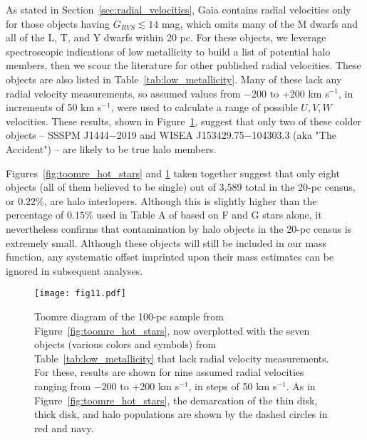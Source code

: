 \documentclass[twocolumn,tighten,twocolappendix]{aastex631}
\begin{document}
As stated in Section~\ref{sec:radial_velocities}, Gaia contains radial velocities only for those objects having $G_{RVS} \lesssim 14$ mag, which omits many of the M dwarfs and all of the L, T, and Y dwarfs within 20 pc. For these objects, we leverage spectroscopic indications of low metallicity to build a list of potential halo members, then we scour the literature for other published radial velocities. These objects are also listed in Table~\ref{tab:low_metallicity}. Many of these lack any radial velocity measurements, so assumed values from $-$200 to +200 km s$^{-1}$, in increments of 50 km s$^{-1}$, were used to calculate a range of possible $U, V, W$ velocities. These results, shown in Figure~\ref{fig:toomre_cold_stars}, suggest that only two of these colder objects -- SSSPM J1444$-$2019 and WISEA J153429.75$-$104303.3 (aka "The Accident") -- are likely to be true halo members. 

Figures~\ref{fig:toomre_hot_stars} and \ref{fig:toomre_cold_stars} taken together suggest that only eight objects (all of them believed to be single) out of 3,589 total in the 20-pc census, or $0.22\%$, are halo interlopers. Although this is slightly higher than the percentage of $0.15\%$ used in Table A of \cite{bensby2014} based on F and G stars alone, it nevertheless confirms that contamination by halo objects in the 20-pc census is extremely small. Although these objects will still be included in our mass function, any systematic offset imprinted upon their mass estimates can be ignored in subsequent analyses. 

\begin{figure}
\texttt{[image: fig11.pdf]}
\caption{Toomre diagram of the 100-pc sample from Figure~\ref{fig:toomre_hot_stars}, now overplotted with the seven objects (various colors and symbols) from Table~\ref{tab:low_metallicity} that lack radial velocity measurements. For these, results are shown for nine assumed radial velocities ranging from $-200$ to +200 km s$^{-1}$, in steps of 50 km s$^{-1}$. As in Figure~\ref{fig:toomre_hot_stars}, the demarcation of the thin disk, thick disk, and halo populations are shown by the dashed circles in red and navy.
\label{fig:toomre_cold_stars}}
\end{figure}
\end{document}
